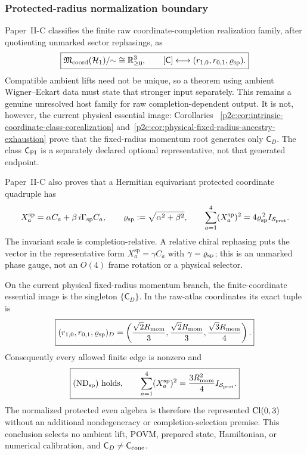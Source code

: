 \documentclass[12pt,a4paper]{article}
\begin{document}
\subsubsection{Protected-radius normalization boundary}
\label{p2:subsec:planck-norm}

Paper~II-C classifies the finite raw coordinate-completion realization
family, after quotienting unmarked sector rephasings, as
\[
 \boxed{\mathfrak M_{\rm coord}(\mathcal H_1)/{\sim}\cong\mathbb R_{\ge0}^3,\qquad
 [\mathsf C]\longleftrightarrow(r_{1,0},r_{0,1},\varrho_{\rm sp}).}
\]
Compatible ambient lifts need not be unique, so a theorem using ambient
Wigner--Eckart data must state that stronger input separately.  This remains a
genuine unresolved host family for raw completion-dependent output.  It is not,
however, the current physical essential image: Corollaries~
\ref{p2c:cor:intrinsic-coordinate-class-corealization}
and~\ref{p2c:cor:physical-fixed-radius-ancestry-exhaustion} prove that the
fixed-radius momentum root generates only \(\mathsf C_D\).
The class \(\mathsf C_{\rm PI}\) is a separately declared optional
representative, not that generated endpoint.

Paper~II-C also proves that a Hermitian equivariant protected coordinate
quadruple has
\[
        X_a^{\mathrm{sp}}
        =\alpha C_a+\beta\,i\Gamma_{\rm sp}C_a,
        \qquad
        \varrho_{\rm sp}:=\sqrt{\alpha^2+\beta^2},
        \qquad
        \sum_{a=1}^4(X_a^{\mathrm{sp}})^2
        =4\varrho_{\rm sp}^{\,2} I_{\mathcal S_{\rm prot}}.
\]
The invariant scale is completion-relative.  A relative chiral rephasing puts
the vector in the representative form
\(X_a^{\mathrm{sp}}=\gamma C_a\) with
\(\gamma=\varrho_{\rm sp}\); this is an unmarked phase gauge, not an \(O(4)\)
frame rotation or a physical selector.

\begin{corollary}
\label{p2e:cor:generated-fixed-radius-protected-branch}
On the current physical fixed-radius momentum branch, the finite-coordinate
essential image is the singleton \(\{\mathsf C_D\}\).  In the raw-atlas
coordinates its exact tuple is
\[
 \boxed{
 (r_{1,0},r_{0,1},\varrho_{\rm sp})_D
 =\left(\frac{\sqrt2R_{\mathrm{mom}}}{3},
        \frac{\sqrt2R_{\mathrm{mom}}}{3},
        \frac{\sqrt3R_{\mathrm{mom}}}{4}\right).}
\]
Consequently every allowed finite edge is nonzero and
\[
 \boxed{
 (\mathrm{ND}_{\rm sp})\ \text{holds},\qquad
 \sum_{a=1}^4(X_a^{\rm sp})^2
 =\frac{3R_{\mathrm{mom}}^2}{4}I_{\mathcal S_{\rm prot}}.}
\]
The normalized protected even algebra is therefore the represented
\(\operatorname{Cl}(0,3)\) without an additional nondegeneracy or completion-selection
premise.  This conclusion selects no ambient lift, POVM, prepared state,
Hamiltonian, or numerical calibration, and \(\mathsf C_D\ne\mathsf C_{\rm cone}\).
\end{corollary}
\end{document}
